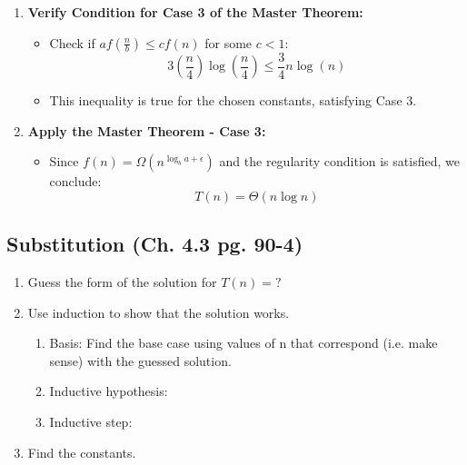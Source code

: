 \begin{example}
\begin{enumerate}
            \item \textbf{Verify Condition for Case 3 of the Master Theorem:}
            \begin{itemize}
                \item Check if \( af\left(\frac{n}{b}\right) \leq cf(n) \) for some \( c < 1 \):
                \[
                3 \left(\frac{n}{4}\right) \log\left(\frac{n}{4}\right) \leq \frac{3}{4} n \log(n)
                \]
                \item This inequality is true for the chosen constants, satisfying Case 3.
            \end{itemize}
            
            \item \textbf{Apply the Master Theorem - Case 3:}
            \begin{itemize}
                \item Since \( f(n) = \Omega\left(n^{\log_b a + \epsilon}\right) \) and the regularity condition is satisfied, we conclude:
                \[
                T(n) = \Theta(n \log n)
                \]
            \end{itemize}
        \end{enumerate}
    \end{example}

\subsection{Substitution (Ch. 4.3 pg. 90-4)}
    \begin{process}
        \begin{enumerate}
            \item Guess the form of the solution for $T(n)=?$
            \item Use induction to show that the solution works.
            \begin{enumerate}
                \item Basis: Find the base case using values of n that correspond (i.e. make sense) with the guessed solution.
                \item Inductive hypothesis:
                \item Inductive step:
            \end{enumerate}
            \item Find the constants.
        \end{enumerate}
    \end{process}
    

